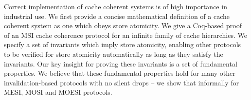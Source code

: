 Correct implementation of cache coherent systems is of high importance in
industrial use. We first provide a concise mathematical definition of a cache
coherent system as one which obeys store atomicity. We give a Coq-based proof
of an MSI cache coherence protocol for an infinite family of cache hierarchies. We
specify a set of invariants which imply store atomicity, enabling other
protocols to be verified for store atomicity automatically as long as they
satisfy the invariants. Our key insight for proving these invariants is a set
of fundamental properties.  We believe that these fundamental properties hold
for many other invalidation-based protocols with no silent drops -- we show
that informally for MESI, MOSI and MOESI protocols.


